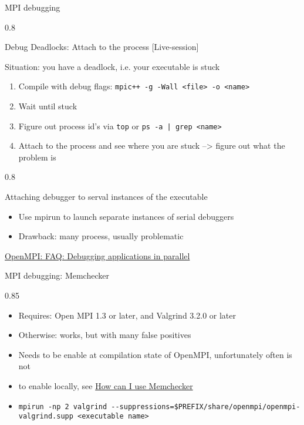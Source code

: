 \documentclass[aspectratio=1610]{beamer}
\newenvironment{centeredblock}[2][0.8\textwidth]
{ %
	\begin{center}
		\begin{varwidth}{#1} %
			\begin{block}{#2}
				\centering
			}
			{ %
			\end{block}
		\end{varwidth}
	\end{center}
}
\begin{document}
	\begin{frame}[fragile]{MPI debugging}
		\begin{centeredblock}{Debug Deadlocks: Attach to the process [Live-session]}
			Situation: you have a deadlock, i.e. your executable is stuck
			\begin{enumerate}
				\item Compile with debug flags: \texttt{mpic++ -g -Wall <file> -o <name>}
				\item Wait until stuck
				\item Figure out process id's via \texttt{top} or \texttt{ps -a | grep <name>}
				\item Attach to the process and see where you are stuck --> figure out what the problem is
			\end{enumerate}
		\end{centeredblock}
		\pause
		\begin{centeredblock}{Attaching debugger to serval instances of the executable}
			\begin{itemize}
				\item Use mpirun to launch separate instances of serial debuggers
				\item Drawback: many process, usually problematic
			\end{itemize}
			\href{https://www.open-mpi.org/faq/?category=debugging#serial-debuggers}{OpenMPI: FAQ: Debugging applications in parallel}
		\end{centeredblock}
	\end{frame}
	
	\begin{frame}[fragile]{MPI debugging: Memchecker}
		\begin{centeredblock}[0.85 \textwidth]{}
			\begin{itemize}
				\item Requires: Open MPI 1.3 or later, and Valgrind 3.2.0 or later
				\item Otherwise: works, but with many false positives
				\item Needs to be enable at compilation state of OpenMPI, unfortunately often is not
				\item to enable locally, see \href{https://www.open-mpi.org/faq/?category=debugging#memchecker}{How can I use Memchecker}
				\item \begin{verbatim}
mpirun -np 2 valgrind --suppressions=$PREFIX/share/openmpi/openmpi-valgrind.supp <executable name>
				\end{verbatim}
			\end{itemize}
		\end{centeredblock}
	\end{frame}
	
\end{document}
